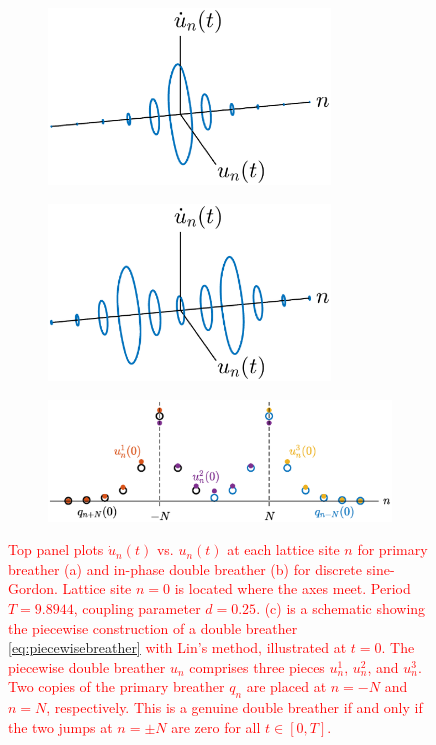 \documentclass[12pt,reqno]{amsart}
\theoremstyle{definition}
\newcommand{\revised}[1]{ \textcolor{red}{#1} }
\begin{document}
\begin{figure}
	\begin{center}
	\begin{subfigure}{0.45\linewidth}
		\caption{}
		\includegraphics[width=7.5cm]{cartoonsingle.eps}
		\label{fig:lina}
	\end{subfigure}
	\begin{subfigure}{0.45\linewidth}
		\caption{}
		\includegraphics[width=7.5cm]{cartoondouble.eps}
		\label{fig:linb}
	\end{subfigure}
	\begin{subfigure}{0.9\linewidth}
		\caption{}
		\includegraphics[width=16cm]{lincartoon.eps}
		\label{fig:linc}
	\end{subfigure}
	\end{center}
	\caption{
	\revised{Top panel plots $\dot{u}_n(t)$ vs. $u_n(t)$ at each lattice site $n$ for primary breather (a) and in-phase double breather (b) for discrete sine-Gordon. Lattice site $n=0$ is located where the axes meet.
	Period $T=9.8944$, coupling parameter $d=0.25$. (c) is a schematic showing the piecewise construction of a double breather \cref{eq:piecewisebreather} with Lin's method, illustrated at $t=0$. The piecewise double breather $u_n$ comprises three pieces $u_n^1$, $u_n^2$, and $u_n^3$. Two copies of the primary breather $q_n$ are placed at $n=-N$ and $n=N$, respectively. This is a genuine double breather if and only if the two jumps at $n=\pm N$ are zero for all $t \in [0,T].$
	}
	}
	\label{fig:lin}
\end{figure}
\end{document}
